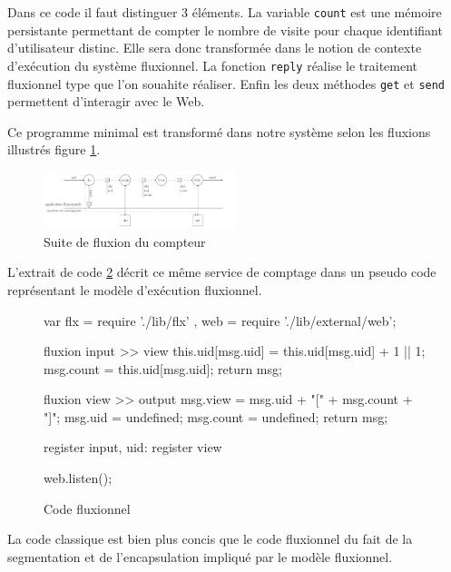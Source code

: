 Dans ce code il faut distinguer 3 éléments.
La variable \texttt{count} est une mémoire persistante permettant de compter le nombre de visite pour chaque identifiant d'utilisateur distinc.
Elle sera donc transformée dans le notion de contexte d'exécution du système fluxionnel.
La fonction \texttt{reply} réalise le traitement fluxionnel type que l'on souahite réaliser.
Enfin les deux méthodes \texttt{get} et \texttt{send} permettent d'interagir avec le Web.

Ce programme minimal est transformé dans notre système selon les fluxions illustrés figure \ref{fig:fluxions}.

\begin{figure}[h!]
  \includegraphics[width=0.5\textwidth]{flux.pdf}
  \caption{Suite de fluxion du compteur}
  \label{fig:fluxions}
\end{figure}

L'extrait de code \ref{lst:fluxionnel} décrit ce même service de comptage dans un pseudo code représentant le modèle d'exécution fluxionnel.

\begin{figure}
  \begin{code}
  var flx = require './lib/flx'
    , web = require './lib/external/web';

  fluxion input >> view
    this.uid[msg.uid] = this.uid[msg.uid] + 1 || 1;
    msg.count = this.uid[msg.uid];
    return msg;

  fluxion view >> output
    msg.view = msg.uid + "[" + msg.count + "]";
    msg.uid = undefined;
    msg.count = undefined;
    return msg;

  register input, {uid: {}}
  register view

  web.listen();
  \end{code}
  \caption{Code fluxionnel}
  \label{lst:fluxionnel}
\end{figure}

La code classique est bien plus concis que le code fluxionnel du fait de la segmentation et de l'encapsulation impliqué par le modèle fluxionnel.

